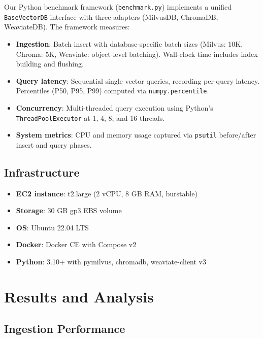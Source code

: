 \documentclass[12pt,a4paper]{article}
\begin{document}
Our Python benchmark framework (\texttt{benchmark.py}) implements a unified \texttt{BaseVectorDB} interface with three adapters (MilvusDB, ChromaDB, WeaviateDB). The framework measures:

\begin{itemize}[nosep]
    \item \textbf{Ingestion}: Batch insert with database-specific batch sizes (Milvus: 10K, Chroma: 5K, Weaviate: object-level batching). Wall-clock time includes index building and flushing.
    \item \textbf{Query latency}: Sequential single-vector queries, recording per-query latency. Percentiles (P50, P95, P99) computed via \texttt{numpy.percentile}.
    \item \textbf{Concurrency}: Multi-threaded query execution using Python's \texttt{ThreadPoolExecutor} at 1, 4, 8, and 16 threads.
    \item \textbf{System metrics}: CPU and memory usage captured via \texttt{psutil} before/after insert and query phases.
\end{itemize}

\subsection{Infrastructure}

\begin{itemize}[nosep]
    \item \textbf{EC2 instance}: t2.large (2 vCPU, 8 GB RAM, burstable)
    \item \textbf{Storage}: 30 GB gp3 EBS volume
    \item \textbf{OS}: Ubuntu 22.04 LTS
    \item \textbf{Docker}: Docker CE with Compose v2
    \item \textbf{Python}: 3.10+ with pymilvus, chromadb, weaviate-client v3
\end{itemize}

\section{Results and Analysis}

\subsection{Ingestion Performance}
\end{document}
